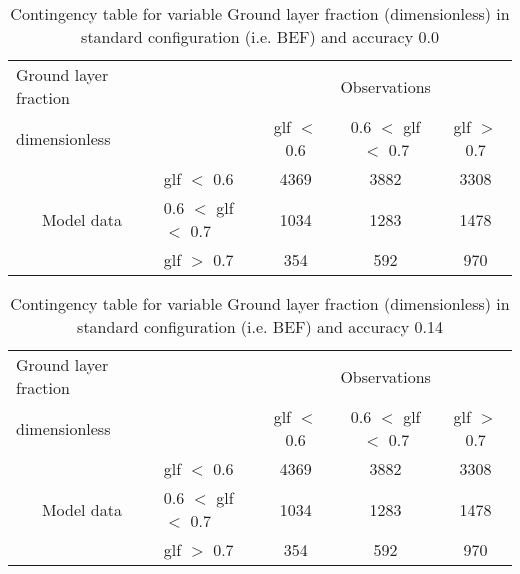 \documentclass[11pt,english]{article}
\begin{document}
\begin{table}[]
\begin{center}
\begin{tabular}{llccc}
\hline
{Ground layer fraction}                                       &                                                    & \multicolumn{3}{c}{Observations}                 \\
{dimensionless}                                       &                             & glf $<$ 0.6   & 0.6 $<$ glf $<$ 0.7 & glf $>$ 0.7 \\
\hline
\multicolumn{1}{c}{\multirow{3}{*}{Model data}}  & glf $<$ 0.6             & 4369                & 3882                       & 3308              \\
                                                 & 0.6  $<$ glf $<$ 0.7 & 1034                & 1283                       & 1478              \\
                                                 & glf $>$ 0.7             & 354                & 592                       & 970              \\
\hline
\end{tabular}
\end{center}
\caption{Contingency table for variable Ground layer fraction (dimensionless) in standard configuration (i.e. BEF) and accuracy 0.0}
\label{tab:contingencyglfBEF}
\end{table}
\begin{table}[]
\begin{center}
\begin{tabular}{llccc}
\hline
{Ground layer fraction}                                       &                                                    & \multicolumn{3}{c}{Observations}                 \\
{dimensionless}                                       &                             & glf $<$ 0.6   & 0.6 $<$ glf $<$ 0.7 & glf $>$ 0.7 \\
\hline
\multicolumn{1}{c}{\multirow{3}{*}{Model data}}  & glf $<$ 0.6             & 4369                & 3882                       & 3308              \\
                                                 & 0.6  $<$ glf $<$ 0.7 & 1034                & 1283                       & 1478              \\
                                                 & glf $>$ 0.7             & 354                & 592                       & 970              \\
\hline
\end{tabular}
\end{center}
\caption{Contingency table for variable Ground layer fraction (dimensionless) in standard configuration (i.e. BEF) and accuracy 0.14}
\label{tab:contingencyglfBEF}
\end{table}
\end{document}
